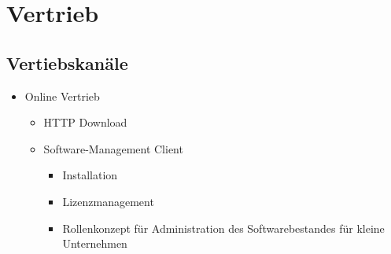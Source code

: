 \chapter{Vertrieb}
	\section{Vertiebskan\"ale}
	\begin{itemize}
		\item Online Vertrieb
		\begin{itemize}
			\item HTTP Download
			\item Software-Management Client
				\begin{itemize}
					\item Installation
					\item Lizenzmanagement
					\item Rollenkonzept f\"ur Administration des Softwarebestandes f\"ur kleine Unternehmen
				\end{itemize}
		\end{itemize}
	\end{itemize}